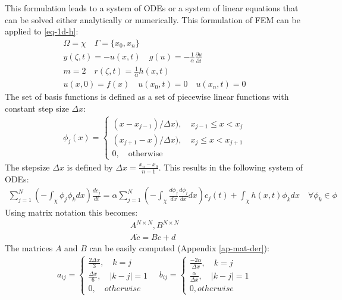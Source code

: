This formulation leads to a system of ODEs or a system of linear equations that can be solved either analytically or numerically. 
This formulation of FEM can be applied to \ref{eq-1d-h}:
\begin{gather}
\Omega = \chi \quad \Gamma = \{x_{0}, x_{n}\} \\
y(\zeta, t) = -u(x, t) \quad g(u) = -\frac{1}{\alpha} \frac{\partial u}{\partial t} \\
m = 2 \quad r(\zeta, t) = \frac{1}{\alpha} h(x,t) \\
u(x, 0) = f(x) \quad u(x_{0}, t) = 0 \quad u(x_{n}, t) = 0
\end{gather}
The set of basis functions is defined as a set of piecewise linear functions with constant step size \(\Delta x\):
\begin{gather}
    \phi_j(x)= 
\begin{cases}
    (x - x_{j-1}) / \Delta x), \quad x_{j-1} \leq x <  x_{j}\\
    (x_{j+1} - x) / \Delta x), \quad x_{j} \leq x <  x_{j + 1}\\
    0,              \quad \text{otherwise}
\end{cases}
\end{gather}
\cite{Gustafsson2011d}
The stepsize \(\Delta x\) is defined by \(\Delta x = \frac{x_n - x_0}{n-1}\). \label{def-delta-x}
This results in the following system of ODEs:
\begin{gather}
\sum_{j=1}^N(-\int_{\chi} \phi_{j}\phi_{k}dx)\frac{dc_{j}}{dt} = \alpha \sum_{j = 1}^N(-\int_{\chi} \frac{d\phi_{j}}{dx}\frac{d\phi_{j}}{dx}dx)c_{j}(t) + \int_{\chi}h(x, t) \phi_{k} dx
\quad \forall \phi_{k} \in \phi \label{eq-heat-fem}
\end{gather}
Using matrix notation this becomes:
\begin{gather}
A^{N \times N}, B^{N \times N} \\
A\dot{c} = Bc + d \label{eq-heat-almost-ss}
\end{gather}
The matrices \(A\) and \(B\) can be easily computed (Appendix \ref{ap-mat-der}):
\begin{gather}
a_{ij} = \begin{cases}
\frac{2\Delta x}{3}, \quad k = j \\
\frac{\Delta x}{6}, \quad |k - j| = 1 \\
0, \quad otherwise 
\end{cases} \label{def-mat-a}
\quad
b_{ij} = \begin{cases}
\frac{-2\alpha}{\Delta x}, \quad k = j \\
\frac{\alpha}{\Delta x}, \quad |k - j| = 1 \\
0, otherwise
\end{cases}
\end{gather}
